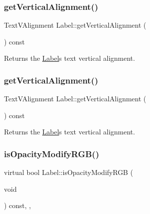\subsubsection{\texorpdfstring{get\+Vertical\+Alignment()}{getVerticalAlignment()}\hspace{0.1cm}{\footnotesize\ttfamily [1/2]}}
{\footnotesize\ttfamily Text\+V\+Alignment Label\+::get\+Vertical\+Alignment (\begin{DoxyParamCaption}{ }\end{DoxyParamCaption}) const\hspace{0.3cm}{\ttfamily [inline]}}

Returns the \hyperlink{classLabel}{Label}\textquotesingle{}s text vertical alignment. \mbox{\label{classLabel_ab3981bcbc2730ddda1cbb68a0faf20ac}} 
\subsubsection{\texorpdfstring{get\+Vertical\+Alignment()}{getVerticalAlignment()}\hspace{0.1cm}{\footnotesize\ttfamily [2/2]}}
{\footnotesize\ttfamily Text\+V\+Alignment Label\+::get\+Vertical\+Alignment (\begin{DoxyParamCaption}{ }\end{DoxyParamCaption}) const\hspace{0.3cm}{\ttfamily [inline]}}

Returns the \hyperlink{classLabel}{Label}\textquotesingle{}s text vertical alignment. \mbox{\label{classLabel_ade8bf273e99add4d4861697d469f6d89}} 
\subsubsection{\texorpdfstring{is\+Opacity\+Modify\+R\+G\+B()}{isOpacityModifyRGB()}\hspace{0.1cm}{\footnotesize\ttfamily [1/2]}}
{\footnotesize\ttfamily virtual bool Label\+::is\+Opacity\+Modify\+R\+GB (\begin{DoxyParamCaption}\item[{void}]{ }\end{DoxyParamCaption}) const\hspace{0.3cm}{\ttfamily [inline]}, {\ttfamily [override]}, {\ttfamily [virtual]}}

